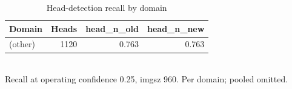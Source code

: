 \begin{table}[t]
\centering
\caption{Head-detection recall by domain}
\label{tab:head_recall}
\begin{tabular}{l r r r}
\toprule
Domain & Heads & head\_n\_old & head\_n\_new \\
\midrule
(other) & 1120 & 0.763 & 0.763 \\
\bottomrule
\end{tabular}
\vspace{2pt}
\\{\footnotesize Recall at operating confidence 0.25, imgsz 960. Per domain; pooled omitted.}
\end{table}

